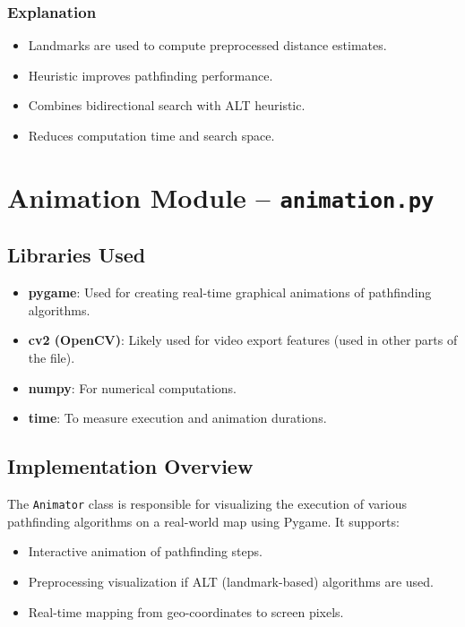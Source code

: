 \subsubsection*{Explanation}
\begin{itemize}
	\item Landmarks are used to compute preprocessed distance estimates.
	\item Heuristic improves pathfinding performance.
	\item Combines bidirectional search with ALT heuristic.
	\item Reduces computation time and search space.
\end{itemize}



\section*{Animation Module – \texttt{animation.py}}

\subsection*{Libraries Used}
\begin{itemize}
	\item \textbf{pygame}: Used for creating real-time graphical animations of pathfinding algorithms.
	\item \textbf{cv2 (OpenCV)}: Likely used for video export features (used in other parts of the file).
	\item \textbf{numpy}: For numerical computations.
	\item \textbf{time}: To measure execution and animation durations.
\end{itemize}

\subsection*{Implementation Overview}
The \texttt{Animator} class is responsible for visualizing the execution of various pathfinding algorithms on a real-world map using Pygame. It supports:
\begin{itemize}
	\item Interactive animation of pathfinding steps.
	\item Preprocessing visualization if ALT (landmark-based) algorithms are used.
	\item Real-time mapping from geo-coordinates to screen pixels.
\end{itemize}

